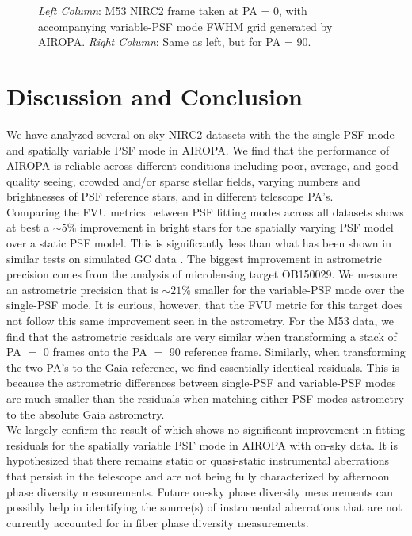 \documentclass[]{spie}  %
\begin{document}
\begin{figure}[!h]
 \caption{\footnotesize \textit{Left Column}: M53 NIRC2 frame taken at PA = 0, with accompanying variable-PSF mode FWHM grid generated by AIROPA. \textit{Right Column}: Same as left, but for PA = 90.} \label{fig:fvu_grid}
\end{figure}


\section{Discussion and Conclusion} \label{sec:conclusion}

\indent We have analyzed several on-sky NIRC2 datasets with the the single PSF mode and spatially variable PSF mode in AIROPA. We find that the performance of AIROPA is reliable across different conditions including poor, average, and good quality seeing, crowded and/or sparse stellar fields, varying numbers and brightnesses of PSF reference stars, and in different telescope PA's.
\\
\indent Comparing the FVU metrics between PSF fitting modes across all datasets shows at best a ${\sim}5\%$ improvement in bright stars for the spatially varying PSF model over a static PSF model. This is significantly less than what has been shown in similar tests on simulated GC data \citep{Turri:inprep}. The biggest improvement in astrometric precision comes from the analysis of microlensing target OB150029. We measure an astrometric precision that is ${\sim}21\%$ smaller for the variable-PSF mode over the single-PSF mode. It is curious, however, that the FVU metric for this target does not follow this same improvement seen in the astrometry. For the M53 data, we find that the astrometric residuals are very similar when transforming a stack of PA $=$ 0 frames onto the PA $=$ 90 reference frame. Similarly, when transforming the two PA's to the Gaia reference, we find essentially identical residuals. This is because the astrometric differences between single-PSF and variable-PSF modes are much smaller than the residuals when matching either PSF modes astrometry to the absolute Gaia astrometry.
\\
\indent We largely confirm the result of \cite{Turri:inprep} which shows no significant improvement in fitting residuals for the spatially variable PSF mode in AIROPA with on-sky data. It is hypothesized that there remains static or quasi-static instrumental aberrations that persist in the telescope and are not being fully characterized by afternoon phase diversity measurements. Future on-sky phase diversity measurements can possibly help in identifying the source(s) of instrumental aberrations that are not currently accounted for in fiber phase diversity measurements. 
\end{document}
